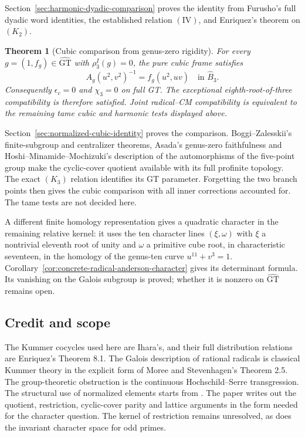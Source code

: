 \documentclass[11pt,a4paper]{article}
\newtheorem{theorem}{Theorem}[section]
\theoremstyle{definition}
\theoremstyle{remark}
\newcommand{\GT}{\widehat{\mathrm{GT}}}
\begin{document}
Section~\ref{sec:harmonic-dyadic-comparison} proves the identity
from Furusho's full dyadic word identities, the established
relation $(\mathrm{IV})$, and Enriquez's theorem on $(K_2)$. 

\begin{theorem}[Cubic comparison from genus-zero rigidity]
\label{thm:main-cubic-normalized}
For every $g=(1,f_g)\in\GT$ with $\rho_3^I(g)=0$, the pure
cubic frame satisfies
\[
 A_g(u^2,v^2)^{-1}=f_g(u^2,uv)
 \quad\text{in }\widehat B_3.
\]
Consequently $\epsilon_c=0$ and $\chi_3=0$ on full GT.
The exceptional eighth-root-of-three compatibility is therefore
satisfied. Joint radical--CM compatibility is equivalent to the
remaining tame cubic and harmonic tests displayed above.
\end{theorem}

Section~\ref{sec:normalized-cubic-identity} proves the comparison.
Boggi--Zalesskii's finite-subgroup and centralizer theorems,
Asada's genus-zero faithfulness and
Hoshi--Minamide--Mochizuki's description of the automorphisms
of the five-point group make the cyclic-cover quotient available
with its full profinite topology. The exact $(K_3)$ relation
identifies its GT parameter. Forgetting the two branch points
then gives the cubic comparison with all inner corrections
accounted for. The tame tests are not decided here.

A different finite homology representation gives a quadratic character
in the remaining relative kernel: it uses the ten character lines
$(\xi,\omega)$ with $\xi$ a nontrivial eleventh root of unity and
$\omega$ a primitive cube root, in characteristic seventeen, in the homology of the genus-ten curve
$u^{11}+v^3=1$.
Corollary~\ref{cor:concrete-radical-anderson-character} gives its
determinant formula. Its vanishing on the Galois subgroup is proved;
whether it is nonzero on $\GT$ remains open.

\subsection*{Credit and scope}
The Kummer cocycles used here are Ihara's, and their full distribution relations are Enriquez's Theorem 8.1. The Galois description of rational radicals is classical Kummer theory in the explicit form of Moree and Stevenhagen's Theorem 2.5. The group-theoretic obstruction is the continuous Hochschild--Serre transgression. The structural use of normalized elements starts from \cite[Theorem 2]{H17}. The paper writes out the quotient, restriction, cyclic-cover parity and lattice arguments in the form needed for the character question. The kernel of restriction remains unresolved, as does the invariant character space for odd primes.
\end{document}
